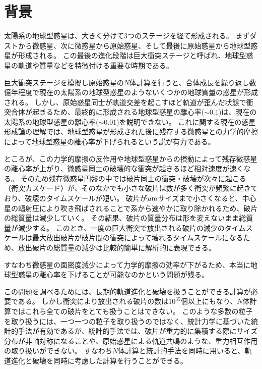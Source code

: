 \documentclass[a4paper,10pt,oneside,twocolumn,notitlepage,final]{jarticle}
\begin{document}
\section{背景}
太陽系の地球型惑星は、大きく分けて3つのステージを経て形成される。
まずダストから微惑星、次に微惑星から原始惑星、そして最後に原始惑星から地球型惑星が形成される。
この最後の進化段階は巨大衝突ステージと呼ばれ、地球型惑星の軌道や質量などを特徴付ける重要な時期である。
\par
巨大衝突ステージを模擬し原始惑星の$N$体計算を行うと、合体成長を繰り返し数億年程度で現在の太陽系の地球型惑星のようないくつかの地球質量の惑星が形成される\citep[e.g.,][]{Chambers_Wetherill_1998,Agnor_etal_1999,Kominami_and_Ida_2002,Kokubo_etal_2006}。
しかし、原始惑星同士が軌道交差を起こすほど軌道が歪んだ状態で衝突合体が起きるため、最終的に形成される地球型惑星の離心率($\sim0.1$)は、現在の太陽系の地球型惑星の離心率($\sim0.01$)を説明できない。
これに関する現在の惑星形成論の理解では、地球型惑星が形成された後に残存する微惑星との力学的摩擦によって地球型惑星の離心率が下げられるという説が有力である\citep{Morishima_etal_2010}。
\par
ところが、この力学的摩擦の反作用や地球型惑星からの摂動によって残存微惑星の離心率が上がり、微惑星同士の破壊的な衝突が起きるほど相対速度が速くなる。
そのため残存微惑星円盤の中では破片同士の衝突・破壊が次々に起こる（衝突カスケード）が、そのなかでも小さな破片は数が多く衝突が頻繁に起きており、破壊のタイムスケールが短い。
破片が$\mu {\rm m}$サイズまで小さくなると、中心星の輻射圧により吹き飛ばされることで系から速やかに取り除かれるため、破片の総質量は減少していく。
その結果、破片の質量分布は形を変えないまま総質量が減少する\citep[e.g.,][]{Tanaka_etal_1996}。
このとき、一度の巨大衝突で放出される破片の減少のタイムスケールは最大放出破片が破片間の衝突によって壊れるタイムスケールになるため、放出破片の総質量の減少は比較的簡単に解析的に表現できる\citep{Kobayashi_Tanaka_2010}。
\par
すなわち微惑星の面密度減少によって力学的摩擦の効率が下がるため、本当に地球型惑星の離心率を下げることが可能なのかという問題が残る。
\par
この問題を調べるためには、長期的軌道進化と破壊を扱うことができる計算が必要である。
しかし衝突により放出される破片の数は$10^{35}$個以上にもなり、$N$体計算ではこれら全ての破片をとても扱うことはできない。
このような多数の粒子を取り扱うには、一つ一つの粒子を取り扱うのではなく、統計力学に基づいた統計的手法が有効であるが、統計的手法では、破片が重力的に集積する際にサイズ分布が非軸対称になることや、原始惑星による軌道共鳴のような、重力相互作用の取り扱いができない。
すなわち$N$体計算と統計的手法を同時に用いると、軌道進化と破壊を同時に考慮した計算を行うことができる。
\end{document}
